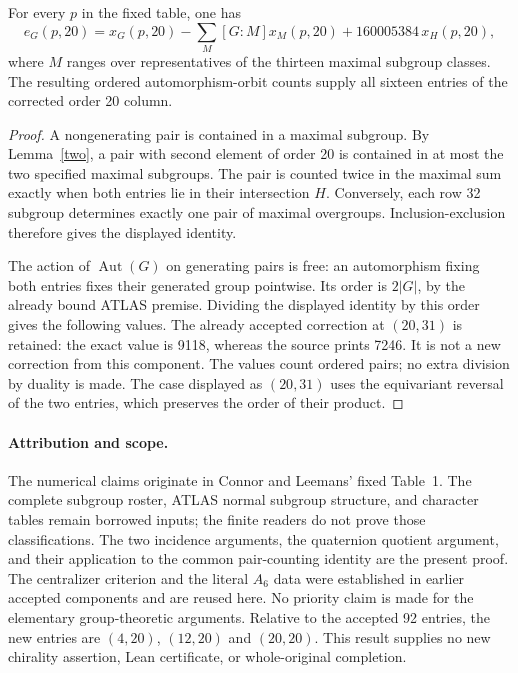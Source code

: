 \documentclass[11pt,a4paper]{article}
\begin{document}
\begin{theorem}
For every $p$ in the fixed table, one has
\[
 e_G(p,20)=x_G(p,20)-\sum_{M}[G:M]x_M(p,20)
                       +160005384\,x_H(p,20),
\]
where $M$ ranges over representatives of the thirteen maximal
subgroup classes. The resulting ordered automorphism-orbit counts
supply all sixteen entries of the corrected order 20 column.
\end{theorem}
\begin{proof}
A nongenerating pair is contained in a maximal subgroup. By
Lemma~\ref{two}, a pair with second element of order 20 is contained
in at most the two specified maximal subgroups. The pair is counted
twice in the maximal sum exactly when both entries lie in their
intersection $H$. Conversely, each row 32 subgroup determines
exactly one pair of maximal overgroups. Inclusion-exclusion therefore
gives the displayed identity.

The action of $\operatorname{Aut}(G)$ on generating pairs is free:
an automorphism fixing both entries fixes their generated group
pointwise. Its order is $2|G|$, by the already bound ATLAS premise.
Dividing the displayed identity by this order gives the following
values. The already accepted correction at $(20,31)$ is retained:
the exact value is 9118, whereas the source prints 7246. It is not a
new correction from this component. The values count ordered pairs; no extra division by duality is
made. The case displayed as $(20,31)$ uses the equivariant reversal
of the two entries, which preserves the order of their product.

\end{proof}

\paragraph{Attribution and scope.}
The numerical claims originate in Connor and Leemans' fixed Table~1.
The complete subgroup roster, ATLAS normal subgroup structure, and
character tables remain borrowed inputs; the finite readers do not
prove those classifications. The two incidence arguments, the
quaternion quotient argument, and their application to the common
pair-counting identity are the present proof. The centralizer
criterion and the literal $A_6$ data were established in earlier
accepted components and are reused here. No priority claim is made
for the elementary group-theoretic arguments. Relative to the
accepted 92 entries, the new entries are $(4,20)$, $(12,20)$ and
$(20,20)$. This result supplies no new chirality assertion, Lean
certificate, or whole-original completion.
\end{document}
